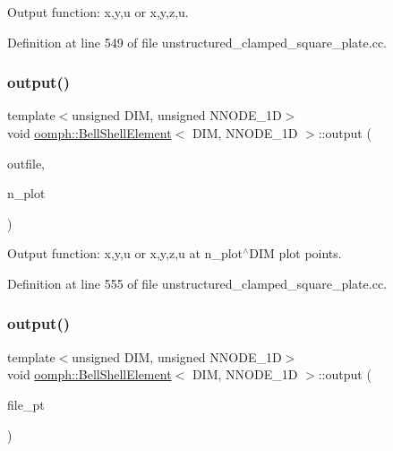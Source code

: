 Output function\+: x,y,u or x,y,z,u. 



Definition at line 549 of file unstructured\+\_\+clamped\+\_\+square\+\_\+plate.\+cc.

\mbox{\label{classoomph_1_1BellShellElement_a3bd16bf3ed27512990a593f8af97826d}} 
\subsubsection{\texorpdfstring{output()}{output()}\hspace{0.1cm}{\footnotesize\ttfamily [2/4]}}
{\footnotesize\ttfamily template$<$unsigned D\+IM, unsigned N\+N\+O\+D\+E\+\_\+1D$>$ \\
void \hyperlink{classoomph_1_1BellShellElement}{oomph\+::\+Bell\+Shell\+Element}$<$ D\+IM, N\+N\+O\+D\+E\+\_\+1D $>$\+::output (\begin{DoxyParamCaption}\item[{std\+::ostream \&}]{outfile,  }\item[{const unsigned \&}]{n\+\_\+plot }\end{DoxyParamCaption})\hspace{0.3cm}{\ttfamily [inline]}}



Output function\+: x,y,u or x,y,z,u at n\+\_\+plot$^\wedge$\+D\+IM plot points. 



Definition at line 555 of file unstructured\+\_\+clamped\+\_\+square\+\_\+plate.\+cc.

\mbox{\label{classoomph_1_1BellShellElement_a9abec4ec4338f67f88fcda4ff143e972}} 
\subsubsection{\texorpdfstring{output()}{output()}\hspace{0.1cm}{\footnotesize\ttfamily [3/4]}}
{\footnotesize\ttfamily template$<$unsigned D\+IM, unsigned N\+N\+O\+D\+E\+\_\+1D$>$ \\
void \hyperlink{classoomph_1_1BellShellElement}{oomph\+::\+Bell\+Shell\+Element}$<$ D\+IM, N\+N\+O\+D\+E\+\_\+1D $>$\+::output (\begin{DoxyParamCaption}\item[{F\+I\+LE $\ast$}]{file\+\_\+pt }\end{DoxyParamCaption})\hspace{0.3cm}{\ttfamily [inline]}}




